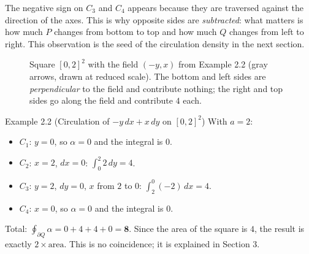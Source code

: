 \documentclass[11pt,letterpaper]{article}
\begin{document}
The negative sign on $C_3$ and $C_4$ appears because they are traversed against
the direction of the axes. This is why opposite sides are \emph{subtracted}:
what matters is how much $P$ changes from bottom to top and how much $Q$ changes
from left to right. This observation is the seed of the circulation density in
the next section.

\begin{figure}[htbp]
\centering
{}
\caption{Square $[0,2]^2$ with the field $(-y,x)$ from Example 2.2 (gray
arrows, drawn at reduced scale). The bottom and left sides are
\emph{perpendicular} to the field and contribute nothing; the right and top
sides go along the field and contribute $4$ each.}
\label{fig:cuadrado}
\end{figure}
\FloatBarrier

\begin{examplebox}{Example 2.2 (Circulation of $-y\,dx+x\,dy$ on $[0,2]^2$)}
With $a=2$:
\begin{itemize}
  \item $C_1$: $y=0$, so $\alpha=0$ and the integral is $0$.
  \item $C_2$: $x=2$, $dx=0$: $\displaystyle\int_0^2 2\,dy=4$.
  \item $C_3$: $y=2$, $dy=0$, $x$ from $2$ to $0$:
        $\displaystyle\int_2^0(-2)\,dx=4$.
  \item $C_4$: $x=0$, so $\alpha=0$ and the integral is $0$.
\end{itemize}
Total: $\oint_{\partial Q}\alpha=0+4+4+0=\mathbf{8}$. Since the area of the
square is $4$, the result is exactly $2\times\text{area}$. This is no
coincidence; it is explained in Section 3.
\end{examplebox}
\end{document}
